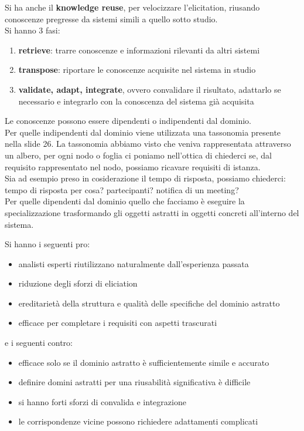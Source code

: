 Si ha anche il \textbf{knowledge reuse}, per velocizzare l'elicitation, riusando conoscenze pregresse da sistemi simili a quello sotto studio.\\
Si hanno 3 fasi:
\begin{enumerate}
  \item \textbf{retrieve}: trarre conoscenze e informazioni rilevanti da altri sistemi
  \item \textbf{transpose}: riportare le conoscenze acquisite nel sistema in studio
  \item \textbf{validate, adapt, integrate}, ovvero convalidare il risultato, adattarlo se necessario e integrarlo con la
  conoscenza del sistema già acquisita
\end{enumerate}
Le conoscenze possono essere dipendenti o indipendenti dal dominio.\\
Per quelle indipendenti dal dominio viene utilizzata una tassonomia presente nella slide 26. La tassonomia abbiamo visto che veniva rappresentata attraverso un albero, per ogni nodo o foglia ci poniamo nell'ottica di chiederci se, dal requisito rappresentato nel nodo, possiamo ricavare requisiti di istanza. \\
Sia ad esempio preso in cosiderazione il tempo di risposta, possiamo chiederci: tempo di risposta per cosa? partecipanti? notifica di un meeting?\\
Per quelle dipendenti dal dominio quello che facciamo è eseguire la specializzazione trasformando gli oggetti astratti in oggetti concreti all'interno del sistema. 

Si hanno i seguenti pro:
\begin{itemize}
  \item analisti esperti riutilizzano naturalmente dall'esperienza passata
  \item riduzione degli sforzi di eliciation
  \item ereditarietà della struttura e qualità delle specifiche del dominio astratto 
  \item efficace per completare i requisiti con aspetti trascurati
\end{itemize}
e i seguenti contro:
\begin{itemize}
  \item efficace solo se il dominio astratto è sufficientemente simile e  accurato 
  \item definire domini astratti per una riusabilità significativa è difficile 
  \item si hanno forti sforzi di convalida e integrazione 
  \item le corrispondenze vicine possono richiedere adattamenti complicati
\end{itemize}

